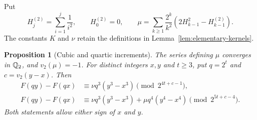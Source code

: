 \documentclass[11pt]{article}
\newtheorem{proposition}[theorem]{Proposition}
\theoremstyle{remark}\newtheorem{remark}[theorem]{Remark}
\begin{document}
Put
\[
 H_j^{(2)}=\sum_{i=1}^j\frac1{i^2},\qquad H_0^{(2)}=0,
 \qquad
 \mu=\sum_{k\ge1}\frac{2^k}{k^2}
       \left(2H_{k-1}^2-H_{k-1}^{(2)}\right).
\]
The constants $K$ and $\nu$ retain the definitions in
Lemma~\ref{lem:elementary-kernels}.

\begin{proposition}[Cubic and quartic increments]\label{prop:cubic-t3}
The series defining $\mu$ converges in $\mathbb Q_2$, and $v_2(\mu)=-1$.
For distinct integers $x,y$ and $t\ge3$, put $q=2^t$ and
$c=v_2(y-x)$. Then
\begin{align}
 F(qy)-F(qx)
 &\equiv\nu q^3(y^3-x^3)
          \pmod{2^{4t+c-1}},\label{eq:sharpened-cubic}\\
 F(qy)-F(qx)
 &\equiv\nu q^3(y^3-x^3)+\mu q^4(y^4-x^4)
          \pmod{2^{5t+c-4}}.\label{eq:quartic-increment}
\end{align}
Both statements allow either sign of $x$ and $y$.
\end{proposition}
\end{document}
